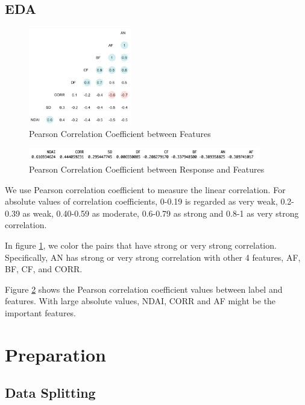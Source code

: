 \documentclass[11pt]{article}
\begin{document}
\subsection{EDA}

\begin{figure}[h]
\includegraphics[width=0.4\textwidth]{1-3-1.jpeg}
\centering
\caption{Pearson Correlation Coefficient between Features}
\label{fig:1-3-1}
\end{figure}

\begin{figure}
\includegraphics[width=0.9\textwidth]{1-3-2.png}
\centering
\caption{Pearson Correlation Coefficient between Response and Features}
\label{fig:1-3-2}
\end{figure}

We use Pearson correlation coefficient to measure the linear correlation. For absolute values of correlation coefficients, 0-0.19 is regarded as very weak, 0.2-0.39 as weak, 0.40-0.59 as moderate, 0.6-0.79 as strong and 0.8-1 as very strong correlation. 

In figure \ref{fig:1-3-1}, we color the pairs that have strong or very strong correlation. Specifically, AN has strong or very strong correlation with other 4 features, AF, BF, CF, and CORR.

Figure \ref{fig:1-3-2} shows the Pearson correlation coefficient values between label and features. With large absolute values, NDAI, CORR and AF might be the important features.






\section{Preparation}
\subsection{Data Splitting}
\end{document}
